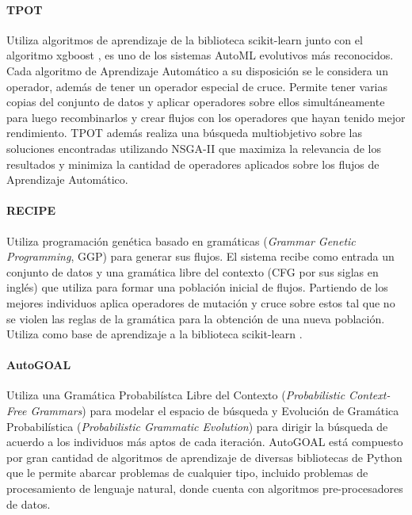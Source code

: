 \paragraph*{TPOT } Utiliza algoritmos de aprendizaje de la biblioteca scikit-learn  junto con el algoritmo xgboost , es uno de los sistemas AutoML evolutivos m\'as reconocidos. Cada algoritmo de Aprendizaje Autom\'atico a su disposici\'on se le considera un operador, adem\'as de tener un operador especial de cruce. Permite tener varias copias del conjunto de datos y aplicar operadores sobre ellos simult\'aneamente para luego recombinarlos y crear flujos con los operadores que hayan tenido mejor rendimiento. TPOT adem\'as realiza una b\'usqueda multiobjetivo sobre las soluciones encontradas utilizando NSGA-II  que maximiza la relevancia de los resultados y minimiza la cantidad de operadores aplicados sobre los flujos de Aprendizaje Autom\'atico. %

\paragraph*{RECIPE } Utiliza programaci\'on gen\'etica basado en gram\'aticas (\textit{Grammar Genetic Programming}, GGP) para generar sus flujos. El sistema recibe como entrada un conjunto de datos y una gram\'atica libre del contexto (CFG por sus siglas en ingl\'es) que utiliza para formar una poblaci\'on inicial de flujos. Partiendo de los mejores individuos aplica operadores de mutaci\'on y cruce sobre estos tal que no se violen las reglas de la gram\'atica para la obtenci\'on de una nueva poblaci\'on. Utiliza como base de aprendizaje a la biblioteca scikit-learn .
 

\paragraph{AutoGOAL } Utiliza una Gram\'atica Probabil\'istca Libre del Contexto (\textit{Probabilistic Context-Free Grammars}) para modelar el espacio de b\'usqueda y Evoluci\'on de Gram\'atica  Probabil\'istica (\textit{Probabilistic Grammatic Evolution})  para dirigir la b\'usqueda de acuerdo a los individuos m\'as aptos de cada iteraci\'on. AutoGOAL est\'a compuesto por gran cantidad de algoritmos de aprendizaje de diversas bibliotecas de Python que le  permite abarcar problemas de cualquier tipo, incluido problemas de procesamiento de lenguaje natural, donde cuenta con algoritmos pre-procesadores de datos.

